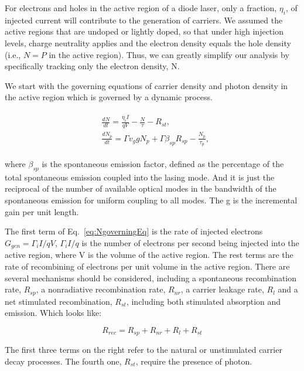 For electrons and holes in the active region of a diode laser, only a fraction,
$\eta_i$, of injected current will contribute to the generation of carriers. We
assumed the active regions that are undoped or lightly doped, so that under
high injection levels, charge neutrality applies and the electron density
equals the hole density (i.e., $N = P$ in the active region). Thus, we can
greatly simplify our analysis by specifically tracking only the electron
density, N.

We start with the governing equations of carrier density and photon density in
the active region which is governed by a dynamic process.

\begin{eqnarray}
\begin{aligned}
  & \frac{dN}{dt} = \frac{\eta_{i}I}{qV} - \frac{N}{\tau} - R_{st},
  \\
  & \frac{dN_p}{dt} = {\Gamma}v_g{g}N_p + \Gamma\beta_{sp}R_{sp} - \frac{N_p}{\tau_p},
\end{aligned}
\label{eq:NgoverningEq}
\end{eqnarray}

where $\beta_{sp}$ is the spontaneous emission factor, defined as the
percentage of the total spontaneous emission coupled into the lasing mode. And
it is just the reciprocal of the number of available optical modes in the
bandwidth of the spontaneous emission for uniform coupling to all modes. The g
is the incremental gain per unit length.

The first term of Eq.~\ref{eq:NgoverningEq} is the rate of injected electrons
$G_{gen} = {\Gamma_{i}I}/{qV}$, ${\Gamma_{i}I}/{q}$ is the number of electrons
per second being injected into the active region, where V is the volume of the
active region. The rest terms are the rate of recombining of electrons per unit
volume in the active region. There are several mechanisms should be considered,
including a spontaneous recombination rate, $R_{sp}$, a nonradiative
recombination rate, $R_{nr}$, a carrier leakage rate, $R_l$ and a net
stimulated recombination, $R_{st}$, including both stimulated absorption and
emission. Which looks like:

\begin{equation}
  R_{rec} = R_{sp} + R_{nr} + R_{l} + R_{st}
\end{equation}

The first three terms on the right refer to the natural or unstimulated carrier
decay processes. The fourth one, $R_{st}$, require the presence of photon.

